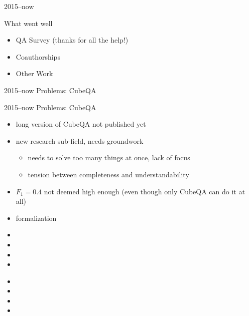 \documentclass[14pt]{beamer}
\begin{document}
\begin{frame}{2015--now }
\begin{block}{What went well}
\begin{itemize}
\item QA Survey (thanks for all the help!) 
\item Coauthorships 
\item Other Work 
\end{itemize}
\end{block}
\end{frame}

\begin{frame}{2015--now Problems: CubeQA}
\end{frame}

\begin{frame}{2015--now Problems: CubeQA}
\begin{itemize}
\item long version of CubeQA not published yet
\item new research sub-field, needs groundwork
\begin{itemize}
\item needs to solve too many things at once, lack of focus
\item tension between completeness and understandability 
\end{itemize}
\item $F_1=0.4$ not deemed high enough (even though only CubeQA can do it at all)
\item formalization  
\end{itemize}
\end{frame}

\begin{frame}{}
\begin{itemize}
\item 
\item 
\item 
\item 
\end{itemize}
\end{frame}

\begin{frame}{}
\begin{itemize}
\item 
\item 
\item 
\item 
\end{itemize}
\end{frame}
\end{document}
